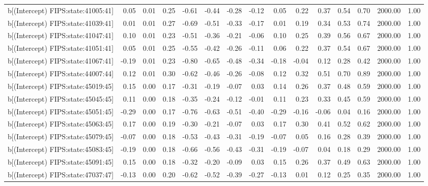 \begin{table}[ht]
\begin{tabular}{rrrrrrrrrrrrrrr}
  b[(Intercept) FIPS:state:41005:41] & 0.05 & 0.01 & 0.25 & -0.61 & -0.44 & -0.28 & -0.12 & 0.05 & 0.22 & 0.37 & 0.54 & 0.70 & 2000.00 & 1.00 \\ 
  b[(Intercept) FIPS:state:41039:41] & 0.01 & 0.01 & 0.27 & -0.69 & -0.51 & -0.33 & -0.17 & 0.01 & 0.19 & 0.34 & 0.53 & 0.74 & 2000.00 & 1.00 \\ 
  b[(Intercept) FIPS:state:41047:41] & 0.10 & 0.01 & 0.23 & -0.51 & -0.36 & -0.21 & -0.06 & 0.10 & 0.25 & 0.39 & 0.56 & 0.67 & 2000.00 & 1.00 \\ 
  b[(Intercept) FIPS:state:41051:41] & 0.05 & 0.01 & 0.25 & -0.55 & -0.42 & -0.26 & -0.11 & 0.06 & 0.22 & 0.37 & 0.54 & 0.67 & 2000.00 & 1.00 \\ 
  b[(Intercept) FIPS:state:41067:41] & -0.19 & 0.01 & 0.23 & -0.80 & -0.65 & -0.48 & -0.34 & -0.18 & -0.04 & 0.12 & 0.28 & 0.42 & 2000.00 & 1.00 \\ 
  b[(Intercept) FIPS:state:44007:44] & 0.12 & 0.01 & 0.30 & -0.62 & -0.46 & -0.26 & -0.08 & 0.12 & 0.32 & 0.51 & 0.70 & 0.89 & 2000.00 & 1.00 \\ 
  b[(Intercept) FIPS:state:45019:45] & 0.15 & 0.00 & 0.17 & -0.31 & -0.19 & -0.07 & 0.03 & 0.14 & 0.26 & 0.37 & 0.48 & 0.59 & 2000.00 & 1.00 \\ 
  b[(Intercept) FIPS:state:45045:45] & 0.11 & 0.00 & 0.18 & -0.35 & -0.24 & -0.12 & -0.01 & 0.11 & 0.23 & 0.33 & 0.45 & 0.59 & 2000.00 & 1.00 \\ 
  b[(Intercept) FIPS:state:45051:45] & -0.29 & 0.00 & 0.17 & -0.76 & -0.63 & -0.51 & -0.40 & -0.29 & -0.16 & -0.06 & 0.04 & 0.16 & 2000.00 & 1.00 \\ 
  b[(Intercept) FIPS:state:45063:45] & 0.17 & 0.00 & 0.19 & -0.30 & -0.21 & -0.07 & 0.03 & 0.17 & 0.30 & 0.41 & 0.52 & 0.62 & 2000.00 & 1.00 \\ 
  b[(Intercept) FIPS:state:45079:45] & -0.07 & 0.00 & 0.18 & -0.53 & -0.43 & -0.31 & -0.19 & -0.07 & 0.05 & 0.16 & 0.28 & 0.39 & 2000.00 & 1.00 \\ 
  b[(Intercept) FIPS:state:45083:45] & -0.19 & 0.00 & 0.18 & -0.66 & -0.56 & -0.43 & -0.31 & -0.19 & -0.07 & 0.04 & 0.18 & 0.29 & 2000.00 & 1.00 \\ 
  b[(Intercept) FIPS:state:45091:45] & 0.15 & 0.00 & 0.18 & -0.32 & -0.20 & -0.09 & 0.03 & 0.15 & 0.26 & 0.37 & 0.49 & 0.63 & 2000.00 & 1.00 \\ 
  b[(Intercept) FIPS:state:47037:47] & -0.13 & 0.00 & 0.20 & -0.62 & -0.52 & -0.39 & -0.27 & -0.13 & 0.01 & 0.12 & 0.25 & 0.35 & 2000.00 & 1.00 \\ 

\end{tabular}
\end{table}
